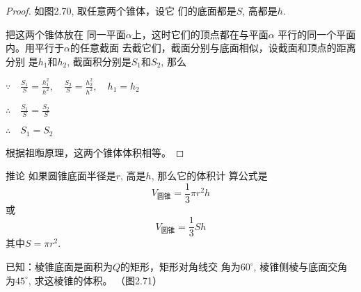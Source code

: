 \begin{proof}
如图2.70, 取任意两个锥体，设它
们的底面都是$S$, 高都是$h$.

把这两个锥体放在
同一平面$\alpha$上，这时它们的顶点都在与平面$\alpha$
平行的同一个平面内。用平行于$\alpha$的任意截面
去截它们，截面分别与底面相似，设截面和顶点的距离分别
是$h_1$和$h_2$, 截面积分别是$S_1$和$S_2$, 那么

$\because\quad \frac{S_1}{S}=\frac{h^2_1}{h^2},\quad \frac{S_2}{S}=\frac{h^2_2}{h^2},\quad h_1=h_2$

$\therefore\quad \frac{S_1}{S}=\frac{S_2}{S}$

$\therefore\quad S_1=S_2$

根据祖暅原理，这两个锥体体积相等。
\end{proof}

\begin{blk}
    {推论} 如果圆锥底面半径是$r$, 高是$h$, 那么它的体积计
算公式是
\[V_{\text{圆锥}}=\frac{1}{3}\pi r^2 h\]
或
\[V_{\text{圆锥}}=\frac{1}{3}S h\]
其中$S=\pi r^2$.
\end{blk}




























\begin{example}
    已知：棱锥底面是面积为$Q$的矩形，矩形对角线交
角为$60^{\circ}$, 棱锥侧棱与底面交角为$45^{\circ}$, 求这棱锥的体积。
（图2.71）
\end{example}

\begin{figure}[htp]
    \centering
{}
    \caption{}
\end{figure}

